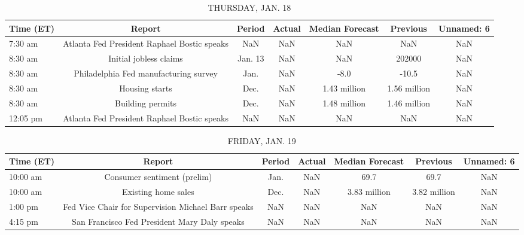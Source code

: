 \documentclass{article}%
\begin{document}
%


\begin{table}[htbp]%
\caption{THURSDAY, JAN. 18}%
\centering%
\begin{adjustbox}{width=1\textwidth}%
\begin{tabular}{lcccccc}
\toprule
Time (ET) &                                      Report &  Period & Actual & Median Forecast &     Previous & Unnamed: 6 \\
\midrule
  7:30 am & Atlanta Fed President Raphael Bostic speaks &     NaN &    NaN &             NaN &          NaN &        NaN \\
  8:30 am &                      Initial jobless claims & Jan. 13 &    NaN &             NaN &       202000 &        NaN \\
  8:30 am &       Philadelphia Fed manufacturing survey &    Jan. &    NaN &            -8.0 &        -10.5 &        NaN \\
  8:30 am &                              Housing starts &    Dec. &    NaN &    1.43 million & 1.56 million &        NaN \\
  8:30 am &                            Building permits &    Dec. &    NaN &    1.48 million & 1.46 million &        NaN \\
 12:05 pm & Atlanta Fed President Raphael Bostic speaks &     NaN &    NaN &             NaN &          NaN &        NaN \\
\bottomrule
\end{tabular}
%
\end{adjustbox}%
\end{table}

%


\begin{table}[htbp]%
\caption{FRIDAY, JAN. 19}%
\centering%
\begin{adjustbox}{width=1\textwidth}%
\begin{tabular}{lcccccc}
\toprule
Time (ET) &                                             Report & Period & Actual & Median Forecast &     Previous & Unnamed: 6 \\
\midrule
 10:00 am &                        Consumer sentiment (prelim) &   Jan. &    NaN &            69.7 &         69.7 &        NaN \\
 10:00 am &                                Existing home sales &   Dec. &    NaN &    3.83 million & 3.82 million &        NaN \\
  1:00 pm & Fed Vice Chair for Supervision Michael Barr speaks &    NaN &    NaN &             NaN &          NaN &        NaN \\
  4:15 pm &       San Francisco Fed President Mary Daly speaks &    NaN &    NaN &             NaN &          NaN &        NaN \\
\bottomrule
\end{tabular}
%
\end{adjustbox}%
\end{table}
\end{document}
